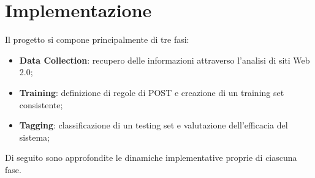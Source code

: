 \documentclass[a4paper]{report}
\begin{document}
\section{Implementazione}
Il progetto si compone principalmente di tre fasi:
\begin{itemize}
\item \textbf{Data Collection}: recupero delle informazioni attraverso l'analisi di siti Web 2.0;
\item \textbf{Training}: definizione di regole di POST e creazione di un training set consistente;
\item \textbf{Tagging}: classificazione di un testing set e valutazione dell'efficacia del sistema;
\end{itemize}
Di seguito sono approfondite le dinamiche implementative proprie di ciascuna fase.
\end{document}
